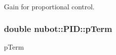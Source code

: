 Gain for proportional control. 

\hypertarget{group__gazebo__common_gac209a483d85ab0a198d36709dd0d089d}{
\subsubsection[{p\-Term}]{\setlength{\rightskip}{0pt plus 5cm}double nubot\-::\-P\-I\-D\-::p\-Term\hspace{0.3cm}{\ttfamily [private]}}}\label{group__gazebo__common_gac209a483d85ab0a198d36709dd0d089d}


p\-Term 

